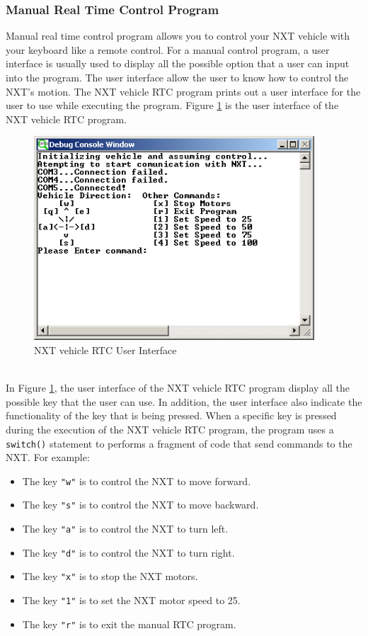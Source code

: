 \subsubsection{Manual Real Time Control Program}
Manual real time control program allows you to control your NXT vehicle with your keyboard like a 
remote control. For a manual control program, a user interface is usually used to display all the 
possible option that a user can input into the program. The user interface allow the user to know how
to control the NXT's motion. The NXT vehicle RTC program prints out a user interface for the user to 
use while executing the program. Figure \ref{fig_NXT_GUI} is the user interface of the NXT vehicle 
RTC program.\\
\begin{figure}[h]
  \begin{center}
    \includegraphics[height=3in]{figure/mindstorm/RTC_GUI.png}
    \caption{NXT vehicle RTC User Interface \label{fig_NXT_GUI}}
  \end{center}
\end{figure}
\\
In Figure \ref{fig_NXT_GUI}, the user interface of the NXT vehicle RTC program display all the 
possible key that the user can use. In addition, the user interface also indicate the functionality 
of the key that is being pressed. When a specific key is pressed during the execution of the NXT 
vehicle RTC program, the program uses a \verb+switch()+ statement to performs a fragment of code that
send commands to the NXT.
For example:\\
\begin{itemize}
\item The key \verb+"w"+ is to control the NXT to move forward.
\item The key \verb+"s"+ is to control the NXT to move backward.
\item The key \verb+"a"+ is to control the NXT to turn left.
\item The key \verb+"d"+ is to control the NXT to turn right.
\item The key \verb+"x"+ is to stop the NXT motors.
\item The key \verb+"1"+ is to set the NXT motor speed to 25.
\item The key \verb+"r"+ is to exit the manual RTC program.
\end{itemize}

